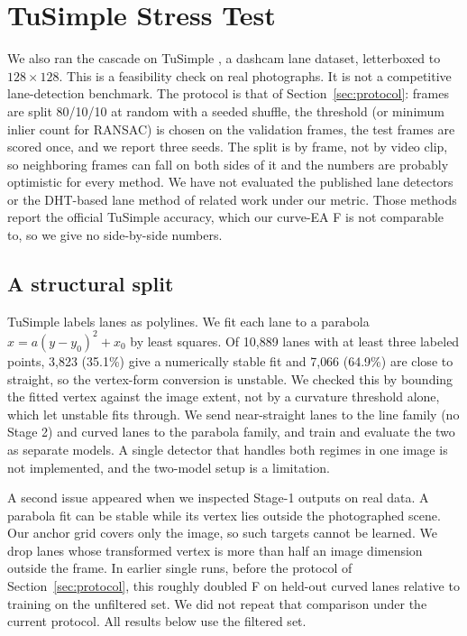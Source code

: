 \documentclass[11pt]{article}
\begin{document}
\section{TuSimple Stress Test}
\label{sec:real}
We also ran the cascade on TuSimple \citep{tusimple2017}, a dashcam lane dataset, letterboxed to $128\times128$. This is a feasibility check on real photographs. It is not a competitive lane-detection benchmark. The protocol is that of Section~\ref{sec:protocol}: frames are split 80/10/10 at random with a seeded shuffle, the threshold (or minimum inlier count for RANSAC) is chosen on the validation frames, the test frames are scored once, and we report three seeds. The split is by frame, not by video clip, so neighboring frames can fall on both sides of it and the numbers are probably optimistic for every method. We have not evaluated the published lane detectors or the DHT-based lane method of related work under our metric. Those methods report the official TuSimple accuracy, which our curve-EA F is not comparable to, so we give no side-by-side numbers.

\subsection{A structural split}
TuSimple labels lanes as polylines. We fit each lane to a parabola $x=a(y-y_0)^2+x_0$ by least squares. Of 10{,}889 lanes with at least three labeled points, 3{,}823 (35.1\%) give a numerically stable fit and 7{,}066 (64.9\%) are close to straight, so the vertex-form conversion is unstable. We checked this by bounding the fitted vertex against the image extent, not by a curvature threshold alone, which let unstable fits through. We send near-straight lanes to the line family (no Stage 2) and curved lanes to the parabola family, and train and evaluate the two as separate models. A single detector that handles both regimes in one image is not implemented, and the two-model setup is a limitation.

A second issue appeared when we inspected Stage-1 outputs on real data. A parabola fit can be stable while its vertex lies outside the photographed scene. Our anchor grid covers only the image, so such targets cannot be learned. We drop lanes whose transformed vertex is more than half an image dimension outside the frame. In earlier single runs, before the protocol of Section~\ref{sec:protocol}, this roughly doubled F on held-out curved lanes relative to training on the unfiltered set. We did not repeat that comparison under the current protocol. All results below use the filtered set.
\end{document}
